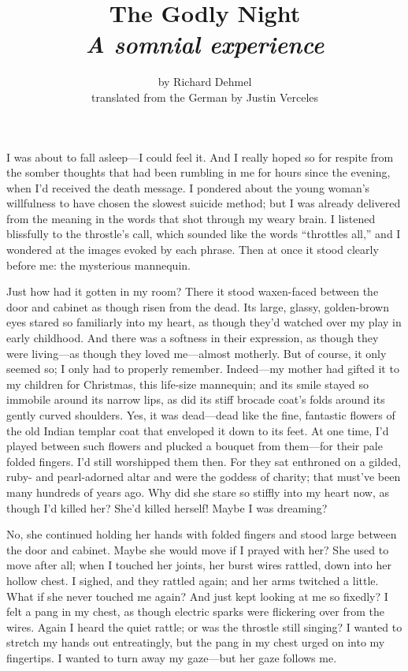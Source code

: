 \documentclass[12pt,a4paper]{article}
\title{The Godly Night\\ \large{\textit{A somnial experience}}}
\author{by Richard Dehmel\\translated from the German by Justin Verceles}
\date{}
\begin{document}
\maketitle

\noindent{}\vspace{10pt}

I was about to fall asleep—I could feel it. And I really hoped so for respite from the somber thoughts that had been rumbling in me for hours since the evening, when I’d received the death message. I pondered about the young woman’s willfulness to have chosen the slowest suicide method; but I was already delivered from the meaning in the words that shot through my weary brain. I listened blissfully to the throstle’s call, which sounded like the words “throttles all,” and I wondered at the images evoked by each phrase. Then at once it stood clearly before me: the mysterious mannequin.

Just how had it gotten in my room? There it stood waxen-faced between the door and cabinet as though risen from the dead. Its large, glassy, golden-brown eyes stared so familiarly into my heart, as though they’d watched over my play in early childhood. And there was a softness in their expression, as though they were living—as though they loved me—almost motherly. But of course, it only seemed so; I only had to properly remember. Indeed—my mother had gifted it to my children for Christmas, this life-size mannequin; and its smile stayed so immobile around its narrow lips, as did its stiff brocade coat’s folds around its gently curved shoulders. Yes, it was dead—dead like the fine, fantastic flowers of the old Indian templar coat that enveloped it down to its feet. At one time, I’d played between such flowers and plucked a bouquet from them—for their pale folded fingers. I’d still worshipped them then. For they sat enthroned on a gilded, ruby- and pearl-adorned altar and were the goddess of charity; that must’ve been many hundreds of years ago. Why did she stare so stiffly into my heart now, as though I’d killed her? She’d killed herself! Maybe I was dreaming?

No, she continued holding her hands with folded fingers and stood large between the door and cabinet. Maybe she would move if I prayed with her? She used to move after all; when I touched her joints, her burst wires rattled, down into her hollow chest. I sighed, and they rattled again; and her arms twitched a little. What if she never touched me again? And just kept looking at me so fixedly? I felt a pang in my chest, as though electric sparks were flickering over from the wires. Again I heard the quiet rattle; or was the throstle still singing? I wanted to stretch my hands out entreatingly, but the pang in my chest urged on into my fingertips. I wanted to turn away my gaze—but her gaze follows me.
\end{document}
